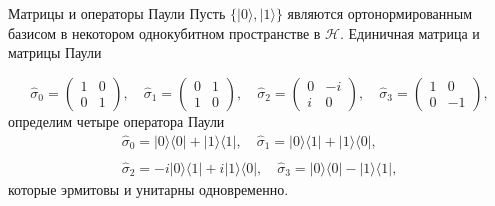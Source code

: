 \documentclass[9pt,pdf,hyperref={unicode=true}]{beamer}
\begin{document}
\begin{frame}[t]{Матрицы и операторы Паули}
Пусть $\{|0\rangle, |1\rangle \}$ являются ортонормированным базисом в некотором однокубитном пространстве в $\mathcal{H}$. Единичная матрица и матрицы Паули

\begin{equation}
	\hat{\sigma}_0=\begin{pmatrix}1 & 0 \\ 0 & 1\end{pmatrix},\quad
	\hat{\sigma}_1=\begin{pmatrix}0 & 1 \\ 1 & 0\end{pmatrix},\quad
	\hat{\sigma}_2=\begin{pmatrix}0 & -i \\ i & 0\end{pmatrix},\quad
	\hat{\sigma}_3=\begin{pmatrix}1 & 0 \\ 0 & -1\end{pmatrix},
\end{equation}
определим четыре оператора Паули
\begin{equation}
	\begin{array}{cc}
		\hat{\sigma}_0 = |0\rangle\langle0| + |1\rangle\langle1|, \quad \hat{\sigma}_1 = |0\rangle\langle1| + |1\rangle\langle0|,\\\\
		\hat{\sigma}_2 = -i|0\rangle\langle1| + i|1\rangle\langle0|, \quad \hat{\sigma}_3 = |0\rangle\langle0| - |1\rangle\langle1|,
	\end{array}
\end{equation}
которые эрмитовы и унитарны одновременно.
\end{frame}

\end{document}
